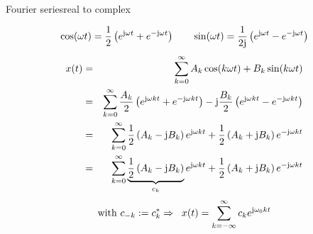         \begin{frame}{Fourier series}{real to complex}
            \vspace{-5mm}
            \begin{footnotesize}
            \begin{equation*}
                \cos(\omega t) = \frac{1}{2}\left(e^{\mathrm{j}\omega t} + e^{-\mathrm{j}\omega t}\right)\quad\quad
                \sin(\omega t) = \frac{1}{2\mathrm{j}}\left(e^{\mathrm{j}\omega t} - e^{-\mathrm{j}\omega t}\right)
            \end{equation*}
            \pause
            \vspace{-2mm}
            \begin{eqnarray*}
                x(t) &=& \sum\limits_{k=0}^{\infty} A_k\cos(k\omega t) + B_k\sin(k\omega t)\nonumber\\
                &=& \sum\limits_{k=0}^{\infty} \frac{A_k}{2}\left(e^{\mathrm{j}\omega kt} + e^{-\mathrm{j}\omega kt}\right) - \mathrm{j}\frac{B_k}{2}\left(e^{\mathrm{j}\omega kt} - e^{-\mathrm{j}\omega kt}\right)\nonumber\\
                &=& \sum\limits_{k=0}^{\infty} \frac{1}{2}\left(A_k-\mathrm{j}B_k\right)e^{\mathrm{j}\omega kt} +  \frac{1}{2}\left(A_k+\mathrm{j}B_k\right)e^{-\mathrm{j}\omega kt}\nonumber\\
                &=& \sum\limits_{k=0}^{\infty} \underbrace{\frac{1}{2}\left(A_k-\mathrm{j}B_k\right)}_{c_k}e^{\mathrm{j}\omega kt} +  \frac{1}{2}\left(A_k+\mathrm{j}B_k\right)e^{-\mathrm{j}\omega kt}\nonumber
            \end{eqnarray*}
            \begin{equation*}\nonumber
               \text{with } c_{-k} := c^\ast_k \Rightarrow\;\; x(t) = \sum\limits_{k=-\infty}^{\infty} c_k e^{\mathrm{j}\omega_0kt}
            \end{equation*}
            \end{footnotesize}
        \end{frame}


